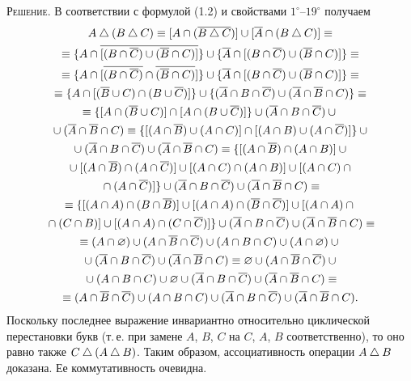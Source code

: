 \textsc{Решение.} В соответствии с формулой (1.2) и свойствами
$1^\circ$--$19^\circ$ получаем
\begin{gather*}
A\mathbin{\triangle}(B\mathbin{\triangle} C)\equiv[A\cap(\overline{B\mathbin{\triangle} C})]\cup[\overline{A}\cap(B\mathbin{\triangle} C)]\equiv\\
\equiv\{A\cap\overline{[(B\cap\overline{C})\cup(\overline{B}\cap C)]}\}\cup\{\overline{A}\cap[(B\cap\overline{C})\cup(\overline{B}\cap C)]\}\equiv\\
\equiv\{A\cap[\overline{(B\cap\overline{C})}\cap\overline{(\overline{B}\cap C)}]\}\cup\{\overline{A}\cap[(B\cap\overline{C})\cup(\overline{B}\cap C)]\}\equiv\\
\equiv\{A\cap[(\overline{B}\cup C)\cap(B\cup\overline{C})]\}\cup\{(\overline{A}\cap B\cap\overline{C})\cup(\overline{A}\cap\overline{B}\cap C)\}\equiv\\
\equiv\{[A\cap(\overline{B}\cup C)]\cap[A\cap(B\cup\overline{C})]\}\cup(\overline{A}\cap B\cap\overline{C})\cup{}\\
{}\cup(\overline{A}\cap\overline{B}\cap C)\equiv\{[(A\cap\overline{B})\cup(A\cap C)]\cap[(A\cap B)\cup(A\cap\overline{C})]\}\cup{}\\
{}\cup(\overline{A}\cap B\cap\overline{C})\cup(\overline{A}\cap\overline{B}\cap C)\equiv\{[(A\cap\overline{B})\cap(A\cap B)]\cup{}\\
{}\cup[(A\cap\overline{B})\cap(A\cap\overline{C})]\cup[(A\cap C)\cap(A\cap B)]\cup[(A\cap C)\cap{}\\
{}\cap(A\cap\overline{C})]\}\cup(\overline{A}\cap B\cap\overline{C})\cup(\overline{A}\cap\overline{B}\cap C)\equiv\\
\equiv\{[(A\cap A)\cap(B\cap\overline{B})]\cup[(A\cap A)\cap(\overline{B}\cap\overline{C})]\cup[(A\cap A)\cap{}\\
{}\cap(C\cap B)]\cup[(A\cap A)\cap(C\cap\overline{C})]\}\cup(\overline{A}\cap B\cap\overline{C})\cup(\overline{A}\cap\overline{B}\cap C)\equiv\\
\equiv(A\cap\varnothing)\cup(A\cap\overline{B}\cap\overline{C})\cup(A\cap B\cap C)\cup(A\cap\varnothing)\cup{}\\
{}\cup(\overline{A}\cap B\cap\overline{C})\cup(\overline{A}\cap\overline{B}\cap C)\equiv\varnothing\cup(A\cap\overline{B}\cap\overline{C})\cup{}\\
{}\cup(A\cap B\cap C)\cup\varnothing\cup(\overline{A}\cap B\cap\overline{C})\cup(\overline{A}\cap\overline{B}\cap C)\equiv\\
\equiv(A\cap\overline{B}\cap\overline{C})\cup(A\cap B\cap C)\cup(\overline{A}\cap B\cap\overline{C})\cup(\overline{A}\cap\overline{B}\cap C).
\end{gather*}
Поскольку последнее выражение инвариантно относительно циклической
перестановки букв (т.\,е. при замене $A$, $B$, $C$ на $C$, $A$, $B$
соответственно), то оно равно также $C\mathbin{\triangle}(A\mathbin{\triangle} B)$. Таким образом,
ассоциативность операции $A\mathbin{\triangle} B$ доказана. Ее коммутативность
очевидна.\fixed{в оригинале в восьмой строке выкладки стоит скобка
<<$([A\cap A)$>> вместо <<$[(A\cap A)$>>.}

